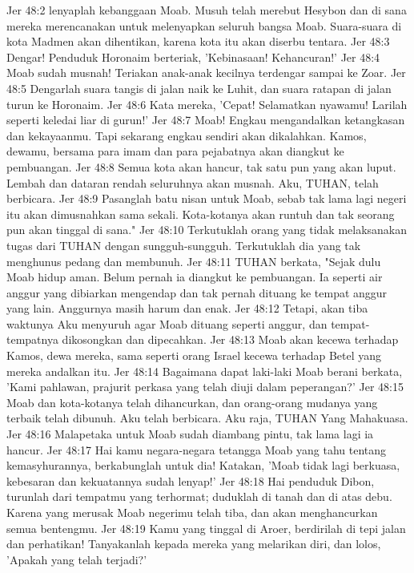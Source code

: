 Jer 48:2  lenyaplah kebanggaan Moab. Musuh telah merebut Hesybon dan di sana mereka merencanakan untuk melenyapkan seluruh bangsa Moab. Suara-suara di kota Madmen akan dihentikan, karena kota itu akan diserbu tentara.
Jer 48:3  Dengar! Penduduk Horonaim berteriak, 'Kebinasaan! Kehancuran!'
Jer 48:4  Moab sudah musnah! Teriakan anak-anak kecilnya terdengar sampai ke Zoar.
Jer 48:5  Dengarlah suara tangis di jalan naik ke Luhit, dan suara ratapan di jalan turun ke Horonaim.
Jer 48:6  Kata mereka, 'Cepat! Selamatkan nyawamu! Larilah seperti keledai liar di gurun!'
Jer 48:7  Moab! Engkau mengandalkan ketangkasan dan kekayaanmu. Tapi sekarang engkau sendiri akan dikalahkan. Kamos, dewamu, bersama para imam dan para pejabatnya akan diangkut ke pembuangan.
Jer 48:8  Semua kota akan hancur, tak satu pun yang akan luput. Lembah dan dataran rendah seluruhnya akan musnah. Aku, TUHAN, telah berbicara.
Jer 48:9  Pasanglah batu nisan untuk Moab, sebab tak lama lagi negeri itu akan dimusnahkan sama sekali. Kota-kotanya akan runtuh dan tak seorang pun akan tinggal di sana."
Jer 48:10  Terkutuklah orang yang tidak melaksanakan tugas dari TUHAN dengan sungguh-sungguh. Terkutuklah dia yang tak menghunus pedang dan membunuh.
Jer 48:11  TUHAN berkata, "Sejak dulu Moab hidup aman. Belum pernah ia diangkut ke pembuangan. Ia seperti air anggur yang dibiarkan mengendap dan tak pernah dituang ke tempat anggur yang lain. Anggurnya masih harum dan enak.
Jer 48:12  Tetapi, akan tiba waktunya Aku menyuruh agar Moab dituang seperti anggur, dan tempat-tempatnya dikosongkan dan dipecahkan.
Jer 48:13  Moab akan kecewa terhadap Kamos, dewa mereka, sama seperti orang Israel kecewa terhadap Betel yang mereka andalkan itu.
Jer 48:14  Bagaimana dapat laki-laki Moab berani berkata, 'Kami pahlawan, prajurit perkasa yang telah diuji dalam peperangan?'
Jer 48:15  Moab dan kota-kotanya telah dihancurkan, dan orang-orang mudanya yang terbaik telah dibunuh. Aku telah berbicara. Aku raja, TUHAN Yang Mahakuasa.
Jer 48:16  Malapetaka untuk Moab sudah diambang pintu, tak lama lagi ia hancur.
Jer 48:17  Hai kamu negara-negara tetangga Moab yang tahu tentang kemasyhurannya, berkabunglah untuk dia! Katakan, 'Moab tidak lagi berkuasa, kebesaran dan kekuatannya sudah lenyap!'
Jer 48:18  Hai penduduk Dibon, turunlah dari tempatmu yang terhormat; duduklah di tanah dan di atas debu. Karena yang merusak Moab negerimu telah tiba, dan akan menghancurkan semua bentengmu.
Jer 48:19  Kamu yang tinggal di Aroer, berdirilah di tepi jalan dan perhatikan! Tanyakanlah kepada mereka yang melarikan diri, dan lolos, 'Apakah yang telah terjadi?'
